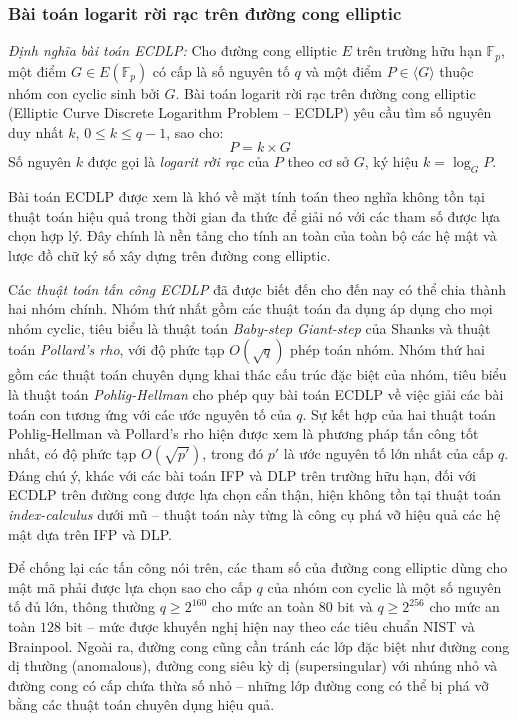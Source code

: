 \subsubsection{Bài toán logarit rời rạc trên đường cong elliptic}

\textit{Định nghĩa bài toán ECDLP:} Cho đường cong elliptic $E$ trên trường hữu hạn $\mathbb{F}_p$, một điểm $G \in E(\mathbb{F}_p)$ có cấp là số nguyên tố $q$ và một điểm $P \in \langle G \rangle$ thuộc nhóm con cyclic sinh bởi $G$. Bài toán logarit rời rạc trên đường cong elliptic (Elliptic Curve Discrete Logarithm Problem -- ECDLP) yêu cầu tìm số nguyên duy nhất $k$, $0 \leq k \leq q - 1$, sao cho:
\begin{equation}
P = k \times G
\label{eq:ecdlp}
\end{equation}
Số nguyên $k$ được gọi là \textit{logarit rời rạc} của $P$ theo cơ sở $G$, ký hiệu $k = \log_G P$.

Bài toán ECDLP được xem là khó về mặt tính toán theo nghĩa không tồn tại thuật toán hiệu quả trong thời gian đa thức để giải nó với các tham số được lựa chọn hợp lý. Đây chính là nền tảng cho tính an toàn của toàn bộ các hệ mật và lược đồ chữ ký số xây dựng trên đường cong elliptic.

Các \textit{thuật toán tấn công ECDLP} đã được biết đến cho đến nay có thể chia thành hai nhóm chính. Nhóm thứ nhất gồm các thuật toán đa dụng áp dụng cho mọi nhóm cyclic, tiêu biểu là thuật toán \textit{Baby-step Giant-step} của Shanks và thuật toán \textit{Pollard's rho}, với độ phức tạp $O(\sqrt{q})$ phép toán nhóm. Nhóm thứ hai gồm các thuật toán chuyên dụng khai thác cấu trúc đặc biệt của nhóm, tiêu biểu là thuật toán \textit{Pohlig-Hellman} cho phép quy bài toán ECDLP về việc giải các bài toán con tương ứng với các ước nguyên tố của $q$. Sự kết hợp của hai thuật toán Pohlig-Hellman và Pollard's rho hiện được xem là phương pháp tấn công tốt nhất, có độ phức tạp $O(\sqrt{p'})$, trong đó $p'$ là ước nguyên tố lớn nhất của cấp $q$. Đáng chú ý, khác với các bài toán IFP và DLP trên trường hữu hạn, đối với ECDLP trên đường cong được lựa chọn cẩn thận, hiện không tồn tại thuật toán \textit{index-calculus} dưới mũ -- thuật toán này từng là công cụ phá vỡ hiệu quả các hệ mật dựa trên IFP và DLP.

Để chống lại các tấn công nói trên, các tham số của đường cong elliptic dùng cho mật mã phải được lựa chọn sao cho cấp $q$ của nhóm con cyclic là một số nguyên tố đủ lớn, thông thường $q \geq 2^{160}$ cho mức an toàn $80$ bit và $q \geq 2^{256}$ cho mức an toàn $128$ bit -- mức được khuyến nghị hiện nay theo các tiêu chuẩn NIST và Brainpool. Ngoài ra, đường cong cũng cần tránh các lớp đặc biệt như đường cong dị thường (anomalous), đường cong siêu kỳ dị (supersingular) với nhúng nhỏ và đường cong có cấp chứa thừa số nhỏ -- những lớp đường cong có thể bị phá vỡ bằng các thuật toán chuyên dụng hiệu quả.

